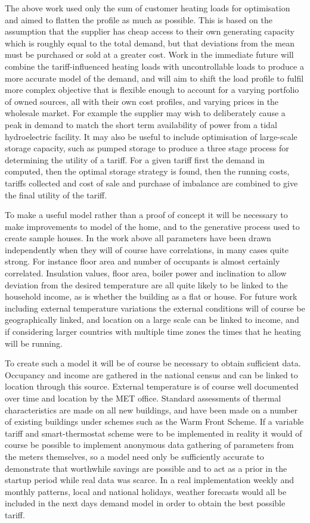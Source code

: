 \documentclass[a4paper, 10 pt, conference]{ieeeconf}  %
\begin{document}
The above work used only the sum of customer heating loads for optimisation and aimed to flatten the profile as much as possible. This is based on the assumption that the supplier has cheap access to their own generating capacity which is roughly equal to the total demand, but that deviations from the mean must be purchased or sold at a greater cost. Work in the immediate future will combine the tariff-influenced heating loads with uncontrollable loads to produce a more accurate model of the demand, and will aim to shift the load profile to fulfil more complex objective that is flexible enough to account for a varying portfolio of owned sources, all with their own cost profiles, and varying prices in the wholesale market. For example the supplier may wish to deliberately cause a peak in demand to match the short term availability of power from a tidal hydroelectric facility. It may also be useful to include optimisation of large-scale storage capacity, such as pumped storage to produce a three stage process for determining the utility of a tariff. For a given tariff first the demand in computed, then the optimal storage strategy is found, then the running costs, tariffs collected and cost of sale and purchase of imbalance are combined to give the final utility of the tariff.

To make a useful model rather than a proof of concept it will be necessary to make improvements to model of the home, and to the generative process used to create sample houses. In the work above all parameters have been drawn independently when they will of course have correlations, in many cases quite strong. For instance floor area and number of occupants is almost certainly correlated. Insulation values, floor area, boiler power and inclination to allow deviation from the desired temperature are all quite likely to be linked to the household income, as is whether the building as a flat or house. For future work including external temperature variations the external conditions will of course be geographically linked, and location on a large scale can be linked to income, and if considering larger countries with multiple time zones the times that he heating will be running.

To create such a model it will be of course be necessary to obtain sufficient data. Occupancy and income are gathered in the national census and can be linked to location through this source. External temperature is of course well documented over time and location by the MET office. Standard assessments of thermal characteristics are made on all new buildings, and have been made on a number of existing buildings under schemes such as the Warm Front Scheme\cite{warmfront}. If a variable tariff and smart-thermostat scheme were to be implemented in reality it would of course be possible to implement anonymous data gathering of parameters from the meters themselves, so a model need only be sufficiently accurate to demonstrate that worthwhile savings are possible and to act as a prior in the startup period while real data was scarce. In a real implementation weekly and monthly patterns, local and national holidays, weather forecasts would all be included in the next days demand model in order to obtain the best possible tariff.
\end{document}
